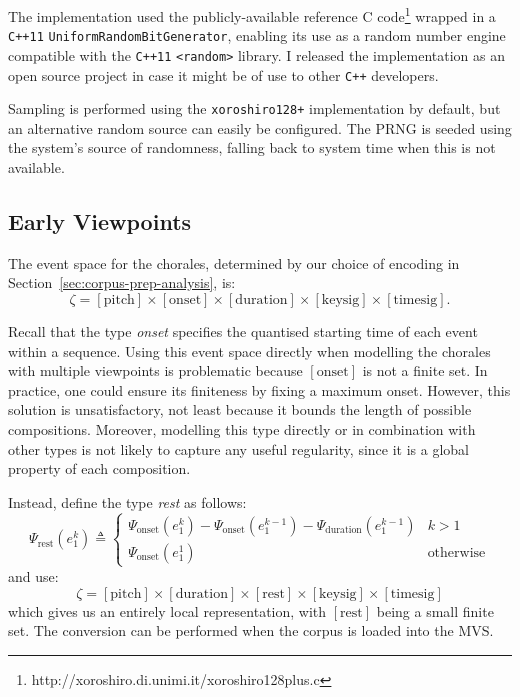 \documentclass[12pt,a4paper,twoside,openright]{report}
\begin{document}
The implementation used the publicly-available reference C
code\footnote{http://xoroshiro.di.unimi.it/xoroshiro128plus.c} wrapped in a
\texttt{C++11} \texttt{UniformRandomBitGenerator}, enabling its use as a random
number engine compatible with the \texttt{C++11} \texttt{<random>} library. I
released the implementation as an open source project in case it might be of use
to other \texttt{C++} developers.

Sampling is performed using the \texttt{xoroshiro128+} implementation by
default, but an alternative random source can easily be configured. The PRNG is
seeded using the system's source of randomness, falling back to system time when
this is not available.

\subsection{Early Viewpoints}

The event space for the chorales, determined by our choice of encoding in
Section~\ref{sec:corpus-prep-analysis}, is:
$$ \zeta = [\mathrm{pitch}] \times [\mathrm{onset}] \times [\mathrm{duration}]
\times [\mathrm{keysig}] \times [\mathrm{timesig}]. $$

Recall that the type \emph{onset} specifies the quantised starting time of each
event within a sequence. Using this event space directly when modelling the
chorales with multiple viewpoints is problematic because $[\mathrm{onset}]$ is
not a finite set. In practice, one could ensure its finiteness by fixing a
maximum onset. However, this solution is unsatisfactory, not least because it
bounds the length of possible compositions. Moreover, modelling this type
directly or in combination with other types is not likely to capture any useful
regularity, since it is a global property of each composition.

Instead, define the type \emph{rest} as follows:
$$ \Psi_{\mathrm{rest}}(e_1^k) \triangleq \begin{cases} 
  \Psi_{\mathrm{onset}}(e_1^k) -
  \Psi_{\mathrm{onset}}(e_1^{k-1}) - \Psi_{\mathrm{duration}}(e_1^{k-1}) & k > 1 \\
  \Psi_{\mathrm{onset}}(e_1^1) & \text{otherwise}
\end{cases} $$
and use:
$$ \zeta = [\mathrm{pitch}] \times [\mathrm{duration}] \times [\mathrm{rest}]
\times [\mathrm{keysig}] \times [\mathrm{timesig}] $$
which gives us an entirely local representation, with $[\mathrm{rest}]$ being a
small finite set. The conversion can be performed when the corpus is loaded into
the MVS. 
\end{document}
